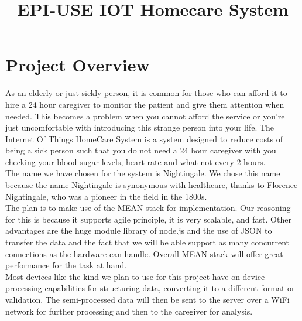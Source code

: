 \documentclass[12pt]{article}
\title{EPI-USE IOT Homecare System}
\begin{document}
    \newcommand{\titleimage}{iot.png}
    
    
    
	
	\newpage

	\section{Project Overview}
	As an elderly or just sickly person, it is common for those who can afford it to hire a 24 hour caregiver to monitor the patient and give them attention when needed. This becomes a problem when you cannot afford the service or you're just uncomfortable with introducing this strange person into your life. The Internet Of Things HomeCare System is a system designed to reduce costs of being a sick person such that you do not need a 24 hour caregiver with you checking your blood sugar levels, heart-rate and what not every 2 hours. \\
	
	The name we have chosen for the system is Nightingale. We chose this name because the name Nightingale is synonymous with healthcare, thanks to Florence Nightingale, who was a pioneer in the field in the 1800s.\\
	
		The plan is to make use of the MEAN stack for implementation. Our reasoning for this is because it supports agile principle, it is very scalable, and fast. Other advantages are the huge module library of node.js and the use of JSON to transfer the data and the fact that we will be able support as many concurrent connections as the hardware can handle. Overall MEAN stack will offer great performance for the task at hand.\\
	
	Most devices like the kind we plan to use for this project have on-device-processing capabilities for structuring data, converting it to a different format or validation. The semi-processed data will then be sent to the server over a WiFi network for further processing and then to the caregiver for analysis.
	
\end{document}
